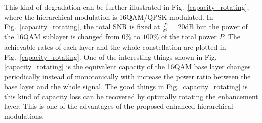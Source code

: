 \documentclass[10pt,fleqn, twocolumn]{IEEEtran}
\begin{document}
This kind of degradation can be further illustrated in
Fig.~\ref{capacity_rotating}, where the hierarchical modulation is
16QAM/QPSK-modulated. In Fig.~\ref{capacity_rotating}, the total
SNR is fixed at $\frac{P}{\sigma^2}=20\mbox{dB}$ but the power of
the 16QAM sublayer is changed from $0\%$ to $100\%$ of the total
power $P$. The achievable rates of each layer and the whole
constellation are plotted in Fig.~\ref{capacity_rotating}. One of
the interesting things shown in Fig. \ref{capacity_rotating} is
the equivalent capacity of the 16QAM base layer changes
periodically instead of monotonically with increase the power
ratio between the base layer and the whole signal. The good things
in Fig. \ref{capacity_rotating} is this kind of capacity loss can
be recovered by optimally rotating the enhancement layer. This is
one of the advantages of the proposed enhanced hierarchical
modulations.
\begin{figure}
\end{figure}
\end{document}
